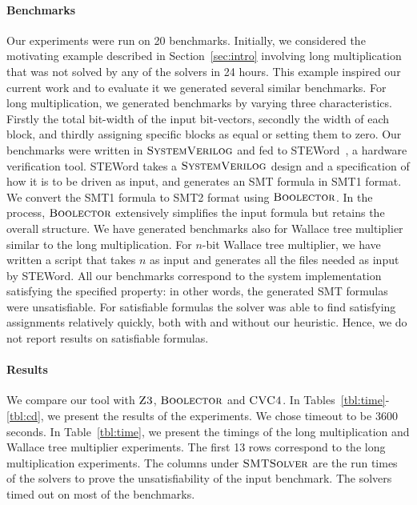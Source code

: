 \paragraph{\bf Benchmarks}
%
Our experiments were run on 20 benchmarks. 
%
Initially, we considered the motivating example described in Section~\ref{sec:intro} involving long multiplication that was not solved by any
of the solvers in 24 hours.
%
This example inspired our current work and to evaluate it we generated several similar benchmarks.
%
For long multiplication, we generated benchmarks by varying three characteristics. Firstly the total bit-width of the input bit-vectors, secondly the width of each block, and thirdly assigning specific blocks as equal or setting them to zero.
%
Our benchmarks were written in $\textsc{SystemVerilog}$ and fed to STEWord~\cite{wste}, a hardware verification tool.
%
STEWord takes a $\textsc{SystemVerilog}$ design and a specification of how it is to be driven
as input, and generates an SMT formula in SMT1 format. %
%
We convert the SMT1 formula to SMT2 format using $\textsc{Boolector}$.
%
In the process, $\textsc{Boolector}$ extensively simplifies the input formula but retains the overall structure.
%
We have generated benchmarks also for Wallace tree multiplier similar to the long multiplication.
%
For $n$-bit Wallace tree multiplier, we have written a script that takes $n$ as input and generates all the files needed as input by STEWord. All our benchmarks correspond to the system implementation satisfying the specified property: in other words, the generated SMT formulas were unsatisfiable. For satisfiable formulas the solver was able to find satisfying assignments relatively quickly, both with and without our heuristic. Hence, we do not report results on satisfiable formulas.
%

\paragraph{\bf Results}
%
We compare our tool with $\textsc{Z3}$, $\textsc{Boolector}$ and $\textsc{CVC4}$.
%
In Tables~\ref{tbl:time}-\ref{tbl:cd}, we present the results of the experiments.
%
We chose timeout to be 3600 seconds.
%
In Table~\ref{tbl:time}, we present the timings of the long multiplication and
Wallace tree multiplier experiments.
%
The first 13 rows correspond to
the long multiplication experiments.
%
The columns under $\textsc{SMTSolver}$ are the run times of the
solvers to prove the unsatisfiability of the input benchmark.
%
The solvers timed out on most of the benchmarks.
%

